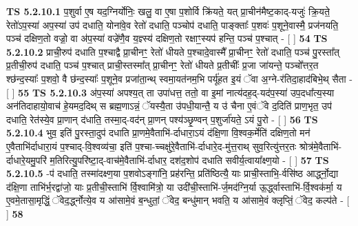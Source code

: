 \documentclass[17pt]{extarticle}
\begin{document}
                                        \textbf{ TS 5.2.10.1} \newline
                  प॒शुर्वा ए॒ष यद॒ग्निर्योनिः॒ खलु॒ वा ए॒षा प॒शोर्वि क्रि॑यते॒ यत् प्रा॒चीन॑मैष्ट॒काद्-यजुः॑ क्रि॒यते॒ रेतो॑ऽप॒स्या॑ अप॒स्या॑ उप॑ दधाति॒ योना॑वे॒व रेतो॑ दधाति॒ पञ्चोप॑ दधाति॒ पाङ्क्ताः᳚ प॒शवः॑ प॒शूने॒वास्मै॒ प्रज॑नयति॒ पञ्च॑ दक्षिण॒तो वज्रो॒ वा अ॑प॒स्या॑ वज्रे॑णै॒व य॒ज्ञ्स्य॑ दक्षिण॒तो रक्षाꣳ॒॒स्यप॑ हन्ति॒ पञ्च॑ प॒श्चात् - [  ] \textbf{  54} \newline
                  \newline
                                \textbf{ TS 5.2.10.2} \newline
                  प्राची॒रुप॑ दधाति प॒श्चाद्वै प्रा॒चीनꣳ॒॒ रेतो॑ धीयते प॒श्चादे॒वास्मै᳚ प्रा॒चीनꣳ॒॒ रेतो॑ दधाति॒ पञ्च॑ पु॒रस्ता᳚त् प्र॒तीची॒रुप॑ दधाति॒ पञ्च॑ प॒श्चात् प्राची॒स्तस्मा᳚त् प्रा॒चीनꣳ॒॒ रेतो॑ धीयते प्र॒तीचीः᳚ प्र॒जा जा॑यन्ते॒ पञ्चो᳚त्तर॒त श्छ॑न्द॒स्याः᳚ प॒शवो॒ वै छ॑न्द॒स्याः᳚ प॒शूने॒व प्रजा॑ता॒न्थ् स्वमा॒यत॑नम॒भि पर्यू॑हत इ॒यं ॅवा अ॒ग्ने-र॑तिदा॒हाद॑बिभे॒थ् सैता - [  ] \textbf{  55} \newline
                  \newline
                                \textbf{ TS 5.2.10.3} \newline
                  अ॑प॒स्या॑ अपश्य॒त् ता उपा॑धत्त॒ ततो॒ वा इ॒मां नात्य॑दह॒द्-यद॑प॒स्या॑ उप॒दधा᳚त्य॒स्या अन॑तिदाहायो॒वाच॑ हे॒यमद॒दिथ् स ब्रह्म॒णाऽन्नं॒ ॅयस्यै॒ता उ॑पधी॒यान्तै॒ य उ॑ चैना ए॒वंॅवे द॒दिति॑ प्राण॒भृत॒ उप॑ दधाति॒ रेत॑स्ये॒व प्रा॒णान् द॑धाति॒ तस्मा॒द्-वद॑न् प्रा॒णन् पश्य॑ञ्छृ॒ण्वन् प॒शुर्जा॑यते॒ ऽयं पु॒रो - [  ] \textbf{  56} \newline
                  \newline
                                \textbf{ TS 5.2.10.4} \newline
                  भुव॒ इति॑ पु॒रस्ता॒दुप॑ दधाति प्रा॒णमे॒वैताभि॑-र्दाधारा॒ऽयं द॑क्षि॒णा वि॒श्वक॒र्मेति॑ दक्षिण॒तो मन॑ ए॒वैताभि॑र्दाधारा॒यं प॒श्चाद्-वि॒श्वव्य॑चा॒ इति॑ प॒श्चा-च्चक्षु॑रे॒वैताभि॑-र्दाधारे॒द-मु॑त्त॒राथ् सुव॒रित्यु॑त्तर॒तः श्रोत्र॑मे॒वैताभि॑-र्दाधारे॒यमु॒परि॑ म॒तिरित्यु॒परि॑ष्टा॒द्-वाच॑मे॒वैताभि॑-र्दाधार॒ दश॑द॒शोप॑ दधाति सवीर्य॒त्वाया᳚क्ष्ण॒यो - [  ] \textbf{  57} \newline
                  \newline
                                \textbf{ TS 5.2.10.5} \newline
                  -प॑ दधाति॒ तस्मा॑दक्ष्ण॒या प॒शवोऽङ्गा॑नि॒ प्रह॑रन्ति॒ प्रति॑ष्ठित्यै॒ याः प्राची॒स्ताभि॒-र्वसि॑ष्ठ आर्द्ध्नो॒द्या द॑क्षि॒णा ताभि॑र्भ॒रद्वा॑जो॒ याः प्र॒तीची॒स्ताभि॑ र्वि॒श्वामि॑त्रो॒ या उदी॑ची॒स्ताभि॑-र्ज॒मद॑ग्नि॒र्या ऊ॒र्द्ध्वास्ताभि॑-र्वि॒श्वक॑र्मा॒ य ए॒वमे॒तासा॒मृद्धिं॒ ॅवेद॒र्द्ध्नोत्ये॒व य आ॑सामे॒वं ब॒न्धुतां॒ ॅवेद॒ बन्धु॑मान् भवति॒ य आ॑सामे॒वं क्लृप्तिं॒ ॅवेद॒ कल्प॑ते - [  ] \textbf{  58} \newline
\end{document}
